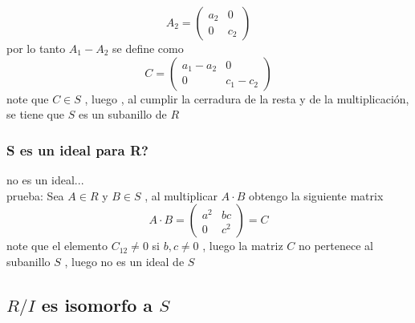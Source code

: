 \documentclass[10pt,a4paper]{article} %
\begin{document}
                \begin{equation}
                    A_2 = \begin{pmatrix}
                        a_2 & 0
                        \\
                        0 & c_2
                    \end{pmatrix}
                \end{equation}
                por lo tanto $ A_1 - A_2  $  se define como
                \begin{equation}
                    C = \begin{pmatrix}
                        a_1 - a_2 & 0
                        \\
                        0 & c_1 - c_2
                    \end{pmatrix}
                \end{equation}
                note que $ C \in S  $ , luego , al cumplir la cerradura de la
                resta y de la multiplicación, se tiene que $ S  $ es un
                subanillo de $ R  $

            \subsubsection{S es un ideal para R?}
                no es un ideal...
                \\
                prueba: Sea $ A \in  R  $  y $ B \in  S  $ , al multiplicar $ A
                \cdot  B  $  obtengo la siguiente matrix
                \begin{equation}
                    A \cdot  B = \begin{pmatrix}
                        a ^{2} & bc
                        \\
                        0 & c ^{2}
                    \end{pmatrix}
                    = C
                \end{equation}
                note que el elemento $ C_{12} \not= 0  $ si $ b , c \not= 0  $
                , luego la matriz $ C  $ no pertenece al subanillo $ S  $ ,
                luego no es un ideal de $ S  $

        \subsection{ $ R/I  $  es isomorfo a $ S  $ }
\end{document}
